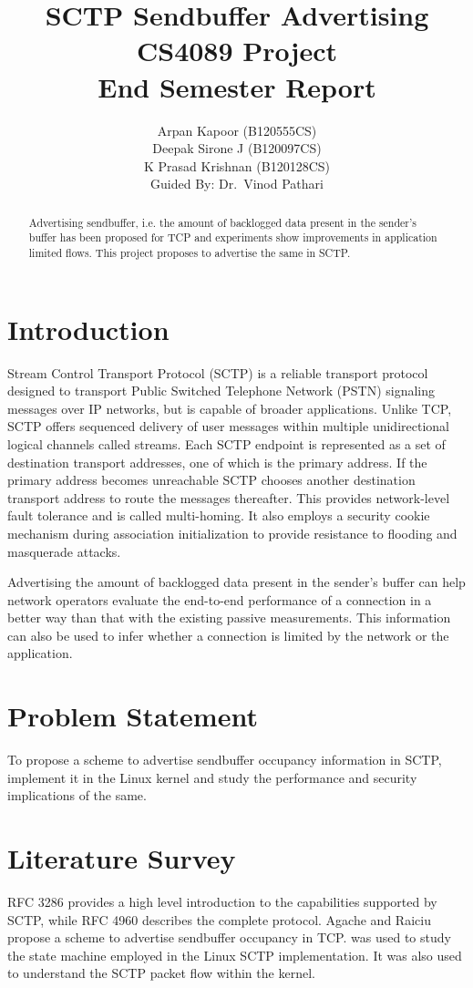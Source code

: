 \documentclass[a4paper,11pt]{article}
\title{SCTP Sendbuffer Advertising\\
	{\normalsize CS4089 Project\\
		End Semester Report}}
\author{Arpan Kapoor (B120555CS)\\
	Deepak Sirone J (B120097CS)\\
	K Prasad Krishnan (B120128CS)\\
	Guided By: Dr.~Vinod Pathari}
\begin{document}
\maketitle

\begin{abstract}
Advertising sendbuffer, i.e.
the amount of backlogged data present in the sender's buffer 
has been proposed for TCP and experiments show
improvements in application limited flows.
This project proposes to advertise the same in SCTP.
\end{abstract}

\section{Introduction}
Stream Control Transport Protocol (SCTP) is a reliable transport protocol
designed to transport Public Switched Telephone Network (PSTN) signaling
messages over IP networks, but is capable of broader applications.
Unlike TCP, SCTP offers sequenced delivery of user messages within multiple
unidirectional logical channels called streams.
Each SCTP endpoint is represented as a set of destination transport addresses,
one of which is the primary address. If the primary address becomes unreachable
SCTP chooses another destination transport address to route the messages 
thereafter. This provides network-level fault tolerance and is called
multi-homing.
It also employs a security cookie mechanism during association initialization
to provide resistance to flooding and masquerade attacks.

Advertising the amount of backlogged data present in the sender's buffer can
help network operators evaluate the end-to-end performance of a connection
in a better way than that with the existing passive measurements.
This information can also be used to infer whether a connection is limited
by the network or the application.

\section{Problem Statement}
To propose a scheme to advertise sendbuffer occupancy information in SCTP,
implement it in the Linux kernel and study the performance and security
implications of the same.

\section{Literature Survey}
RFC 3286 \cite{rfc3286} provides a high level introduction to the capabilities
supported by SCTP, while RFC 4960 \cite{rfc4960} describes the complete
protocol. Agache and Raiciu \cite{tcp-sndbufadv} propose a scheme to advertise
sendbuffer occupancy in TCP. \cite{budigerelinux} was used to study the state
machine employed in the Linux SCTP implementation. It was also used to 
understand the SCTP packet flow within the kernel.
\end{document}
